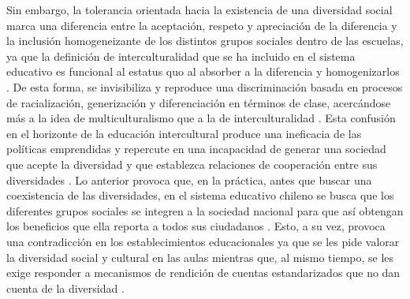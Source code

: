 \documentclass[12pt,twoside]{templates/facsothesis}
\begin{document}
Sin embargo, la tolerancia orientada hacia la existencia de una diversidad social marca una diferencia entre la aceptación, respeto y apreciación de la diferencia y la inclusión homogeneizante de los distintos grupos sociales dentro de las escuelas, ya que la definición de interculturalidad que se ha incluido en el sistema educativo es funcional al estatus quo al absorber a la diferencia y homogenizarlos \citep{riedemann_Desde_2020}. De esta forma, se invisibiliza y reproduce una discriminación basada en procesos de racialización, generización y diferenciación en términos de clase, acercándose más a la idea de multiculturalismo que a la de interculturalidad \citep{stefoni_Educacion_2016a}. Esta confusión en el horizonte de la educación intercultural produce una ineficacia de las políticas emprendidas y repercute en una incapacidad de generar una sociedad que acepte la diversidad y que establezca relaciones de cooperación entre sus diversidades \citep{donosoromo_INTERCULTURALIDAD_2006}. Lo anterior provoca que, en la práctica, antes que buscar una coexistencia de las diversidades, en el sistema educativo chileno se busca que los diferentes grupos sociales se integren a la sociedad nacional para que así obtengan los beneficios que ella reporta a todos sus ciudadanos \citep{donosoromo_INTERCULTURALIDAD_2006}. Esto, a su vez, provoca una contradicción en los establecimientos educacionales ya que se les pide valorar la diversidad social y cultural en las aulas mientras que, al mismo tiempo, se les exige responder a mecanismos de rendición de cuentas estandarizados que no dan cuenta de la diversidad \citep{riedemann_Desde_2020}.
\end{document}
